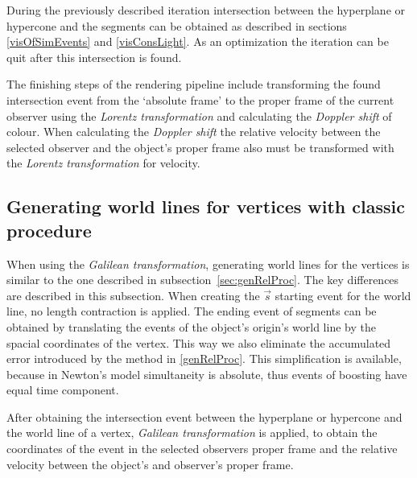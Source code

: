 \documentclass{egpubl}
\begin{document}
During the previously described iteration intersection between the hyperplane or hypercone and the segments can be obtained as described in sections \ref{visOfSimEvents} and \ref{visConsLight}. As an optimization the iteration can be quit after this intersection is found.

The finishing steps of the rendering pipeline include transforming the found intersection event from the `absolute frame' to the proper frame of the current observer using the \emph{Lorentz transformation} and calculating the \emph{Doppler shift} of colour. When calculating the \emph{Doppler shift} the relative velocity between the selected observer and the object's proper frame also must be transformed with the \emph{Lorentz transformation} for velocity.

\subsection{Generating world lines for vertices with classic procedure}
When using the \emph{Galilean transformation}, generating world lines for the vertices is similar to the one described in subsection~\ref{sec:genRelProc}. The key differences are described in this subsection. When creating the $\vec{s}$ starting event for the world line, no length contraction is applied. The ending event of segments can be obtained by translating the events of the object's origin's world line by the spacial coordinates of the vertex. This way we also eliminate the accumulated error introduced by the method in \ref{genRelProc}. This simplification is available, because in Newton's model simultaneity is absolute, thus events of boosting have equal time component.

After obtaining the intersection event between the hyperplane or hypercone and the world line of a vertex, \emph{Galilean transformation} is applied, to obtain the coordinates of the event in the selected observers proper frame and the relative velocity between the object's and observer's proper frame.
\end{document}
